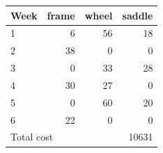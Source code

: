\begin{tabular}{lrrr}
\hline
Week & frame & wheel & saddle \\
\hline
1 & 6 & 56 & 18 \\
2 & 38 & 0 & 0 \\
3 & 0 & 33 & 28 \\
4 & 30 & 27 & 0 \\
5 & 0 & 60 & 20 \\
6 & 22 & 0 & 0 \\
\hline
\multicolumn{3}{l}{Total cost} & 10631 \\
\hline
\end{tabular}
